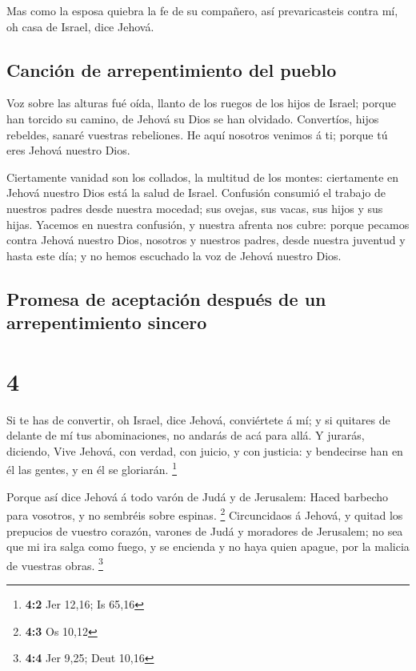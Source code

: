  Mas como la esposa quiebra la fe de su compañero, así
prevaricasteis contra mí, oh casa de Israel, dice Jehová.

\hypertarget{canciuxf3n-de-arrepentimiento-del-pueblo}{%
\subsection{Canción de arrepentimiento del
pueblo}\label{canciuxf3n-de-arrepentimiento-del-pueblo}}

 Voz sobre las alturas fué oída, llanto de los ruegos de
los hijos de Israel; porque han torcido su camino, de Jehová su Dios se
han olvidado.  Convertíos, hijos rebeldes, sanaré
vuestras rebeliones. He aquí nosotros venimos á ti; porque tú eres
Jehová nuestro Dios.

 Ciertamente vanidad son los collados, la multitud de los
montes: ciertamente en Jehová nuestro Dios está la salud de Israel.
 Confusión consumió el trabajo de nuestros padres desde
nuestra mocedad; sus ovejas, sus vacas, sus hijos y sus hijas.
 Yacemos en nuestra confusión, y nuestra afrenta nos
cubre: porque pecamos contra Jehová nuestro Dios, nosotros y nuestros
padres, desde nuestra juventud y hasta este día; y no hemos escuchado la
voz de Jehová nuestro Dios.

\hypertarget{promesa-de-aceptaciuxf3n-despuuxe9s-de-un-arrepentimiento-sincero}{%
\subsection{Promesa de aceptación después de un arrepentimiento
sincero}\label{promesa-de-aceptaciuxf3n-despuuxe9s-de-un-arrepentimiento-sincero}}

\hypertarget{section-3}{%
\section{4}\label{section-3}}

 Si te has de convertir, oh Israel, dice Jehová,
conviértete á mí; y si quitares de delante de mí tus abominaciones, no
andarás de acá para allá.  Y jurarás, diciendo, Vive
Jehová, con verdad, con juicio, y con justicia: y bendecirse han en él
las gentes, y en él se gloriarán. \footnote{\textbf{4:2} Jer 12,16; Is
  65,16}

 Porque así dice Jehová á todo varón de Judá y de
Jerusalem: Haced barbecho para vosotros, y no sembréis sobre espinas.
\footnote{\textbf{4:3} Os 10,12}  Circuncidaos á Jehová, y
quitad los prepucios de vuestro corazón, varones de Judá y moradores de
Jerusalem; no sea que mi ira salga como fuego, y se encienda y no haya
quien apague, por la malicia de vuestras obras. \footnote{\textbf{4:4}
  Jer 9,25; Deut 10,16}

